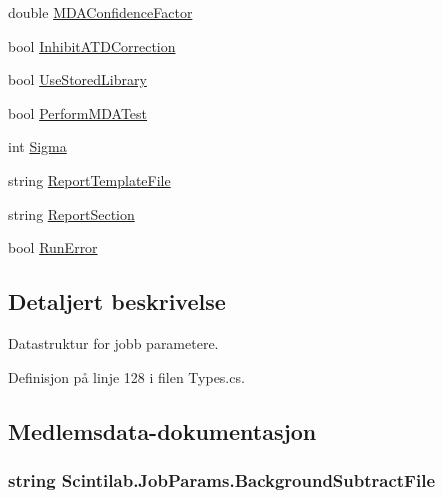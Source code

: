 \begin{DoxyCompactItemize}
\item 
double \hyperlink{class_scintilab_1_1_job_params_ad98e65942d6316fe4e5c21da9802fd3a}{M\+D\+A\+Confidence\+Factor}
\item 
bool \hyperlink{class_scintilab_1_1_job_params_a804db87ae9d00496b0fb4288fad3d76b}{Inhibit\+A\+T\+D\+Correction}
\item 
bool \hyperlink{class_scintilab_1_1_job_params_a1512decdca52cc00a01713c41e1c173f}{Use\+Stored\+Library}
\item 
bool \hyperlink{class_scintilab_1_1_job_params_af88d8af35608c73df1ac871a77f5a03b}{Perform\+M\+D\+A\+Test}
\item 
int \hyperlink{class_scintilab_1_1_job_params_a54ccd1ff53de6e2bd371c0fd61360193}{Sigma}
\item 
string \hyperlink{class_scintilab_1_1_job_params_a47c82919d1513d1bbef4387feaba1764}{Report\+Template\+File}
\item 
string \hyperlink{class_scintilab_1_1_job_params_a9aa084b19e170f8f07640ac290cb75bc}{Report\+Section}
\item 
bool \hyperlink{class_scintilab_1_1_job_params_a6c08ea591430550f4ca4cc42ee2b7cca}{Run\+Error}
\end{DoxyCompactItemize}


\subsection{Detaljert beskrivelse}
Datastruktur for jobb parametere. 

Definisjon på linje 128 i filen Types.\+cs.



\subsection{Medlemsdata-\/dokumentasjon}
\hypertarget{class_scintilab_1_1_job_params_a2cc234f12fe0c4b2b9fceaabf038e1b6}{
\subsubsection[{Background\+Subtract\+File}]{\setlength{\rightskip}{0pt plus 5cm}string Scintilab.\+Job\+Params.\+Background\+Subtract\+File}}\label{class_scintilab_1_1_job_params_a2cc234f12fe0c4b2b9fceaabf038e1b6}


